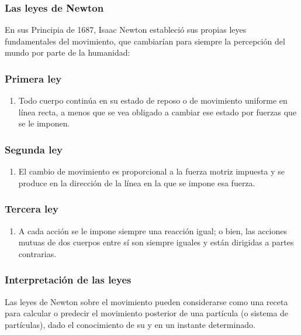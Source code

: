 \documentclass[12pt]{beamer}
\begin{document}
\begin{frame}
\frametitle{Las leyes de Newton}
En sus Principia de 1687, Isaac Newton estableció sus propias leyes fundamentales del movimiento, que cambiarían para siempre la percepción del mundo por parte de la humanidad:
\end{frame}
\begin{frame}
\frametitle{Primera ley}
\begin{enumerate}[<+->]
\item Todo cuerpo continúa en su estado de reposo o de movimiento uniforme en línea recta, a menos que se vea obligado a cambiar ese estado por fuerzas que se le imponen.
\seti
\end{enumerate}
\end{frame}
\begin{frame}
\frametitle{Segunda ley}
\begin{enumerate}[<+->]
\conti
\item El cambio de movimiento es proporcional a la fuerza motriz impuesta y se produce en la dirección de la línea en la que se impone esa fuerza.
\seti
\end{enumerate}
\end{frame}
\begin{frame}
\frametitle{Tercera ley}
\begin{enumerate}[<+->]
\conti
\item A cada acción se le impone siempre una reacción igual; o bien, las acciones mutuas de dos cuerpos entre sí son siempre iguales y están dirigidas a partes contrarias.
\end{enumerate}
\end{frame}
\begin{frame}
\frametitle{Interpretación de las leyes}
Las leyes de Newton sobre el movimiento pueden considerarse como una receta para calcular o predecir el movimiento posterior de una partícula (o sistema de partículas), dado el conocimiento de su  y  en un instante determinado.
\end{frame}
\end{document}
